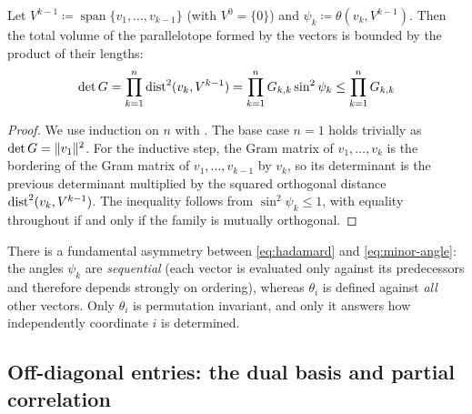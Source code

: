 \documentclass{IEEEtran}
\begin{document}
\begin{corollary}
  \label{cor:hadamard}
  Let $V^{k-1} \coloneq \operatorname{span}\{v_{1},\dots,v_{k-1}\}$ (with $V^{0} = \{0\}$) and $\psi_{k} \coloneq \theta(v_{k}, V^{k-1})$. Then the total volume of the parallelotope formed by the vectors is bounded by the product of their lengths:
  \begin{equation}    \label{eq:hadamard}
    \det G = \prod_{k=1}^{n} \operatorname{dist}^{2}(v_{k}, V^{k-1})
    = \prod_{k=1}^{n} G_{k,k} \sin^{2}\psi_{k}
    \le  \prod_{k=1}^{n} G_{k,k}
  \end{equation}
\end{corollary}

\begin{proof}
  We use induction on $n$ with . The base case $n=1$ holds trivially as $\det G = \lVert v_{1}\rVert^{2}$. For the inductive step, the Gram matrix of $v_{1},\ldots,v_{k}$ is the bordering of the Gram matrix of $v_{1},\ldots,v_{k-1}$ by $v_{k}$, so its determinant is the previous determinant multiplied by the squared orthogonal distance $\operatorname{dist}^{2}(v_{k}, V^{k-1})$. The inequality follows from $\sin^{2}\psi_{k} \le 1$, with equality throughout if and only if the family is mutually orthogonal.
\end{proof}
There is a fundamental asymmetry between \eqref{eq:hadamard} and \eqref{eq:minor-angle}: the angles $\psi_{k}$ are \emph{sequential} (each vector is evaluated only against its predecessors and therefore depends strongly on ordering), whereas $\theta_{i}$ is defined against \emph{all} other vectors. Only $\theta_{i}$ is permutation invariant, and only it answers how independently coordinate $i$ is determined.

\subsection{Off-diagonal entries: the dual basis and partial correlation}
\end{document}
